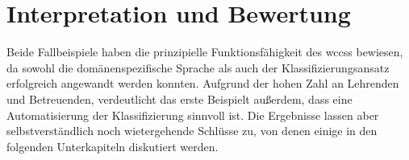 \section{Interpretation und Bewertung}
    \label{section:findingsInterpretation}
    Beide Fallbeispiele haben die prinzipielle Funktionsfähigkeit des \glspl{wccs} bewiesen,
    da sowohl die domänenspezifische Sprache als auch der Klassifizierungsansatz
    erfolgreich angewandt werden konnten.
    Aufgrund der hohen Zahl an Lehrenden und Betreuenden,
    verdeutlicht das erste Beispielt außerdem,
    dass eine Automatisierung der Klassifizierung sinnvoll ist.
    Die Ergebnisse lassen aber selbstverständlich noch wietergehende Schlüsse zu,
    von denen einige in den folgenden Unterkapiteln diskutiert werden.

    
    
    
    
    
